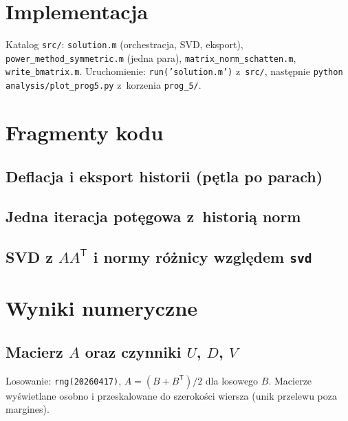 \documentclass[polish]{template/projectreport}
\begin{document}
\section{Implementacja}
Katalog \texttt{src/}: \texttt{solution.m} (orchestracja, SVD, eksport), \texttt{power\_method\_symmetric.m} (jedna para),
\texttt{matrix\_norm\_schatten.m}, \texttt{write\_bmatrix.m}. Uruchomienie: \texttt{run('solution.m')} z~\texttt{src/},
następnie \texttt{python analysis/plot\_prog5.py} z~korzenia \texttt{prog\_5/}.

\section{Fragmenty kodu}
\subsection{Deflacja i eksport historii (pętla po parach)}


\subsection{Jedna iteracja potęgowa z~historią norm}


\subsection{SVD z $AA^{\mathsf{T}}$ i normy różnicy względem \texttt{svd}}


\section{Wyniki numeryczne}

\subsection{Macierz $A$ oraz czynniki $U$, $D$, $V$}
Losowanie: \texttt{rng(20260417)}, $A=(B+B^{\mathsf{T}})/2$ dla losowego $B$.
Macierze wyświetlane osobno i przeskalowane do szerokości wiersza (unik przelewu poza margines).
\end{document}
